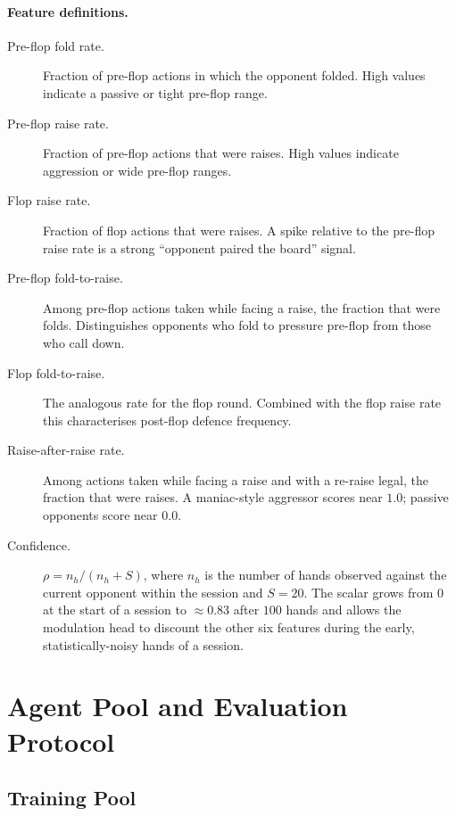 \paragraph{Feature definitions.}
\begin{description}
\item[Pre-flop fold rate.] Fraction of pre-flop actions in which the
opponent folded. High values indicate a passive or tight pre-flop range.

\item[Pre-flop raise rate.] Fraction of pre-flop actions that were
raises. High values indicate aggression or wide pre-flop ranges.

\item[Flop raise rate.] Fraction of flop actions that were raises. A
spike relative to the pre-flop raise rate is a strong ``opponent paired
the board'' signal.

\item[Pre-flop fold-to-raise.] Among pre-flop actions taken while facing
a raise, the fraction that were folds. Distinguishes opponents who fold
to pressure pre-flop from those who call down.

\item[Flop fold-to-raise.] The analogous rate for the flop round.
Combined with the flop raise rate this characterises post-flop defence
frequency.

\item[Raise-after-raise rate.] Among actions taken while facing a raise
and with a re-raise legal, the fraction that were raises. A maniac-style
aggressor scores near $1.0$; passive opponents score near $0.0$.

\item[Confidence.] $\rho = n_h / (n_h + S)$, where $n_h$ is the number
of hands observed against the current opponent within the session and
$S = 20$. The scalar grows from $0$ at the start of a session to
$\approx 0.83$ after $100$ hands and allows the modulation head to
discount the other six features during the early, statistically-noisy
hands of a session.
\end{description}

\section{Agent Pool and Evaluation Protocol}
\label{app:pool}

\subsection{Training Pool}

